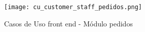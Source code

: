 \begin{figure}[H]
        \texttt{[image: cu\_customer\_staff\_pedidos.png]}
        \caption{Casos de Uso front end - Módulo pedidos}
        \label{fig:cu_customer_staff_pedidos}
        \centering
    \end{figure}